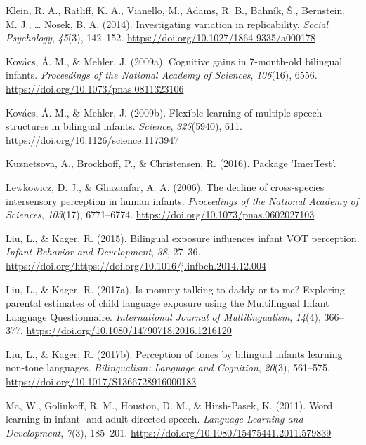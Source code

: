 \documentclass[english,,man,floatsintext]{apa6}
\begin{document}
\leavevmode\hypertarget{ref-klein_2014}{}%
Klein, R. A., Ratliff, K. A., Vianello, M., Adams, R. B., Bahník, Š., Bernstein, M. J., \ldots{} Nosek, B. A. (2014). Investigating variation in replicability. \emph{Social Psychology}, \emph{45}(3), 142--152. \url{https://doi.org/10.1027/1864-9335/a000178}

\leavevmode\hypertarget{ref-kovacs_2009a}{}%
Kovács, Á. M., \& Mehler, J. (2009a). Cognitive gains in 7-month-old bilingual infants. \emph{Proceedings of the National Academy of Sciences}, \emph{106}(16), 6556. \url{https://doi.org/10.1073/pnas.0811323106}

\leavevmode\hypertarget{ref-kovacs_2009b}{}%
Kovács, Á. M., \& Mehler, J. (2009b). Flexible learning of multiple speech structures in bilingual infants. \emph{Science}, \emph{325}(5940), 611. \url{https://doi.org/10.1126/science.1173947}

\leavevmode\hypertarget{ref-kuznetsova_2016}{}%
Kuznetsova, A., Brockhoff, P., \& Christensen, R. (2016). Package 'ImerTest'.

\leavevmode\hypertarget{ref-lewkowicz_2006}{}%
Lewkowicz, D. J., \& Ghazanfar, A. A. (2006). The decline of cross-species intersensory perception in human infants. \emph{Proceedings of the National Academy of Sciences}, \emph{103}(17), 6771--6774. \url{https://doi.org/10.1073/pnas.0602027103}

\leavevmode\hypertarget{ref-liu_2015}{}%
Liu, L., \& Kager, R. (2015). Bilingual exposure influences infant VOT perception. \emph{Infant Behavior and Development}, \emph{38}, 27--36. \url{https://doi.org/https://doi.org/10.1016/j.infbeh.2014.12.004}

\leavevmode\hypertarget{ref-liu_2017a}{}%
Liu, L., \& Kager, R. (2017a). Is mommy talking to daddy or to me? Exploring parental estimates of child language exposure using the Multilingual Infant Language Questionnaire. \emph{International Journal of Multilingualism}, \emph{14}(4), 366--377. \url{https://doi.org/10.1080/14790718.2016.1216120}

\leavevmode\hypertarget{ref-liu_2017b}{}%
Liu, L., \& Kager, R. (2017b). Perception of tones by bilingual infants learning non-tone languages. \emph{Bilingualism: Language and Cognition}, \emph{20}(3), 561--575. \url{https://doi.org/10.1017/S1366728916000183}

\leavevmode\hypertarget{ref-ma_2011}{}%
Ma, W., Golinkoff, R. M., Houston, D. M., \& Hirsh-Pasek, K. (2011). Word learning in infant- and adult-directed speech. \emph{Language Learning and Development}, \emph{7}(3), 185--201. \url{https://doi.org/10.1080/15475441.2011.579839}
\end{document}
